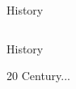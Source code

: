 \documentclass{beamer}
\begin{document}
{\begin{frame}{History}
\begin{columns}
\begin{column}{0.16\textwidth}
        \end{column}
    \end{columns}
\end{frame}
}

{

\begin{frame}{History}
    \begin{center}
        \Huge{20 Century...}
    \end{center}
\end{frame}

}
\end{document}
